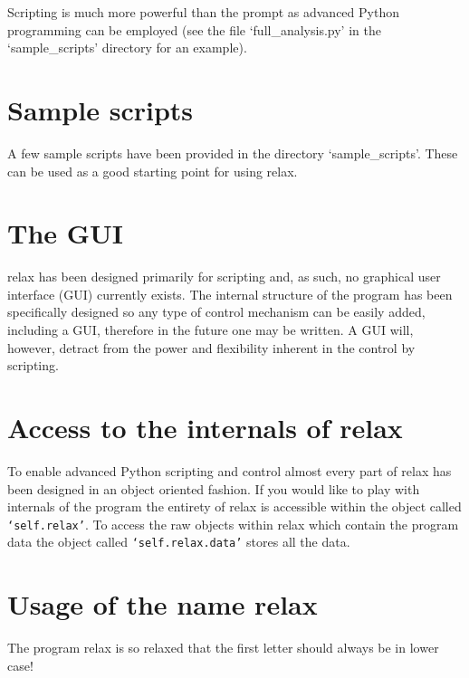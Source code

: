 Scripting is much more powerful than the prompt as advanced Python programming can be employed (see the file `full\_analysis.py' in the `sample\_scripts' directory for an example).




\section{Sample scripts}

A few sample scripts have been provided in the directory `sample\_scripts'.  These can be used as a good starting point for using relax.




\section{The GUI}

relax has been designed primarily for scripting and, as such, no graphical user interface (GUI) currently exists.  The internal structure of the program has been specifically designed so any type of control mechanism can be easily added, including a GUI, therefore in the future one may be written.  A GUI will, however, detract from the power and flexibility inherent in the control by scripting.




\section{Access to the internals of relax}

To enable advanced Python scripting and control almost every part of relax has been designed in an object oriented fashion.  If you would like to play with internals of the program the entirety of relax is accessible within the object called \texttt{`self.relax'}.  To access the raw objects within relax which contain the program data the object called \texttt{`self.relax.data'} stores all the data.





\section{Usage of the name relax}

The program relax is so relaxed that the first letter should always be in lower case!
